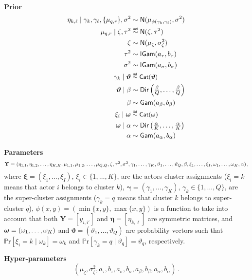 \documentclass[letterpaper,12pt,openany]{article}
\newcommand\simiid{\mathrel{\overset{\makebox[0pt]{\mbox{\normalfont\tiny\sffamily iid}}}{\sim}}}
\newcommand\simind{\mathrel{\overset{\makebox[0pt]{\mbox{\normalfont\tiny\sffamily ind}}}{\sim}}}
\newcommand{\pr}[1]{\mathbb{P}\text{r}\left[#1\right]}
\def\Cat{\small{\mathsf{Cat}}}
\def\Dir{\small{\mathsf{Dir}}}
\def\Nor{\small{\mathsf{N}}}
\def\Gamd{\small{\mathsf{Gam}}}
\def\IGamd{\small{\mathsf{IGam}}}
\def\Y{\mathbf{Y}}\def\y{\mathbf{y}}\def\Yv{\boldsymbol{Y}}\def\yv{\boldsymbol{y}}
\def\al{\alpha}\def\alv{\boldsymbol{\alpha}}
\def\be{\beta}\def\bev{\boldsymbol{\beta}}
\def\ga{\gamma}\def\gav{\boldsymbol{\gamma}}
\def\vte{\vartheta}\def\vtev{\boldsymbol{\vartheta}}
\def\sig{\sigma}\def\sigv{\boldsymbol{\sigma}}
\def\ome{\omega}
\def\etav{\boldsymbol{\eta}}
\def\xiv{\boldsymbol{\xi}}
\begin{document}
\textbf{Prior}
\begin{align*}
\eta_{k,\ell} \mid\ga_k,\ga_\ell, \{\mu_{q,r}\},\sig^2 &\sim \Nor(\mu_{\phi(\ga_k,\ga_\ell)},\sig^2) \\
\mu_{q,r} \mid \zeta,\tau^2 &\simind \Nor(\zeta,\tau^2) \\
\zeta  &\sim \Nor(\mu_\zeta, \sig^2_\zeta) \\
\tau^2 &\sim \IGamd(a_\tau,b_\tau)\\
\sigma^2 &\sim \IGamd(a_\sig,b_\sig) \\
\ga_k\mid\vtev &\simiid \Cat(\vtev) \\
\vtev\mid\be &\sim \Dir\left(\tfrac{\be}{Q},\ldots,\tfrac{\be}{Q}\right) \\
\be &\sim \Gamd(a_\be,b_\be) \\
\xi_i\mid\omev &\simiid \Cat(\omev) \\
\omev\mid\al &\sim \Dir\left(\tfrac{\al}{K},\ldots,\tfrac{\al}{K}\right) \\
\al &\sim \Gamd(a_\al,b_\al)
\end{align*}

\textbf{Parameters}
$$\UPS=(\eta_{1,1},\eta_{1,2},\ldots,\eta_{K,K},\mu_{1,1},\mu_{1,2},\ldots,\mu_{Q,Q},\zeta,\tau^2,\sig^2,\ga_1,\ldots,\ga_K,\vte_1,\ldots,\vte_Q, \beta, \xi_1,\ldots,\xi_I,\omega_1,\ldots,\omega_K, \alpha)\,,$$
where $\xiv=(\xi_1,\ldots,\xi_I)$, $\xi_i\in\{1,\ldots,K\}$, are the actors-cluster assignments ($\xi_i=k$ means that actor $i$ belongs to cluster $k$), $\gav=(\ga_1,\ldots,\ga_K)$, $\ga_k\in\{1,\ldots,Q\}$, are the super-cluster assignments ($\ga_k=q$ means that cluster $k$ belongs to super-cluster $q$), $\phi(x,y)=(\min\{x,y\},\max\{x,y\})$ is a function to take into account that both $\Y = [y_{i,i'}]$ and $\etav=[\eta_{k,\ell}]$ are symmetric matrices, and $\omev=(\ome_1,\ldots,\ome_K)$ and $\vtev=(\vte_1,\ldots,\vte_Q)$ are probability vectors such that $\pr{\xi_i=k\mid \ome_k} = \ome_k$ and $\pr{\ga_k=q\mid \vte_q} =\vte_q$, respectively.

\textbf{Hyper-parameters} $$(\mu_\zeta, \sig^2_\zeta, a_\tau, b_\tau, a_{\sig}, b_{\sig}, a_{\be}, b_{\be}, a_\al, b_\al)\,.$$
\end{document}
